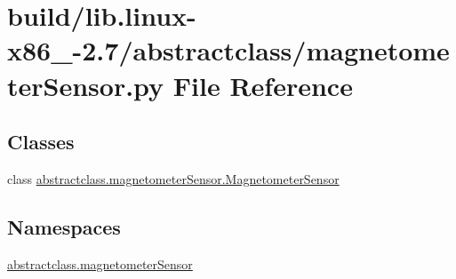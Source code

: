 \hypertarget{build_2lib_8linux-x86__64-2_87_2abstractclass_2magnetometerSensor_8py}{}\section{build/lib.linux-\/x86\+\_-\/2.7/abstractclass/magnetometer\+Sensor.py File Reference}
\label{build_2lib_8linux-x86__64-2_87_2abstractclass_2magnetometerSensor_8py}
\subsection*{Classes}
\begin{DoxyCompactItemize}
\item 
class \hyperlink{classabstractclass_1_1magnetometerSensor_1_1MagnetometerSensor}{abstractclass.\+magnetometer\+Sensor.\+Magnetometer\+Sensor}
\end{DoxyCompactItemize}
\subsection*{Namespaces}
\begin{DoxyCompactItemize}
\item 
 \hyperlink{namespaceabstractclass_1_1magnetometerSensor}{abstractclass.\+magnetometer\+Sensor}
\end{DoxyCompactItemize}
